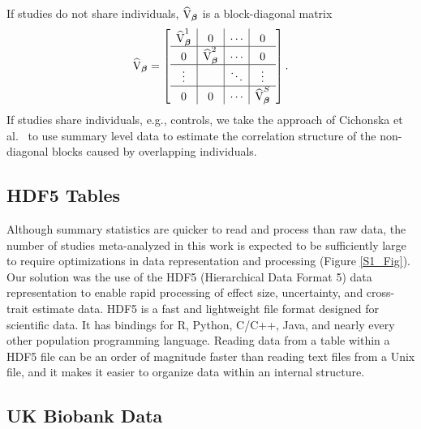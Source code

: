 If studies do not share individuals, $\widehat{\mathbf{\textrm{V}}}_{{\boldsymbol {\beta}}}$ is a block-diagonal matrix 
$$\widehat{\mathbf{\textrm{V}}}_{{\boldsymbol {\beta}}}=
 \left[\begin{array}{c|c|c|c}
 \widehat{\mathbf{\textrm{V}}}^{1}_{{\boldsymbol \beta}} & 0 & \cdots &0\\ \hline
0 & \widehat{\mathbf{\textrm{V}}}^{2}_{{\boldsymbol \beta}}&\cdots &0 \\ \hline
\vdots & &\ddots &\vdots \\ \hline
0 & 0 &\cdots & \widehat{\mathbf{\textrm{V}}}^{S}_{{\boldsymbol {\beta}}}\\
\end{array}\right].$$
If studies share individuals, e.g., controls, 
we take the approach of Cichonska et al.~\cite{cichonska2016metacca} to use summary level data
to estimate the correlation structure of the non-diagonal blocks caused by overlapping individuals. 

\subsection*{HDF5 Tables}
Although summary statistics are quicker to read and process than raw data, the number of studies meta-analyzed in this work is expected to be sufficiently large to require optimizations in data representation and processing (Figure \ref{S1_Fig}). Our solution was the use of the HDF5 (Hierarchical Data Format 5) data representation to enable rapid processing of effect size, uncertainty, and cross-trait estimate data. HDF5 is a fast and lightweight file format designed for scientific data. It has bindings for R, Python, C/C++, Java, and nearly every other population programming language. Reading data from a table within a HDF5 file can be an order of magnitude faster than reading text files from a Unix file, and it makes it easier to organize data within an internal structure.

\subsection*{UK Biobank Data}
